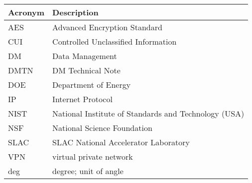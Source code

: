 \addtocounter{table}{-1}
\begin{longtable}{p{}p{}}\hline
\textbf{Acronym} & \textbf{Description}  \\\hline

AES & Advanced Encryption Standard \\\hline
CUI & Controlled Unclassified Information \\\hline
DM & Data Management \\\hline
DMTN & DM Technical Note \\\hline
DOE & Department of Energy \\\hline
IP & Internet Protocol \\\hline
NIST & National Institute of Standards and Technology (USA) \\\hline
NSF & National Science Foundation \\\hline
SLAC & SLAC National Accelerator Laboratory \\\hline
VPN & virtual private network \\\hline
deg & degree; unit of angle \\\hline
\end{longtable}
